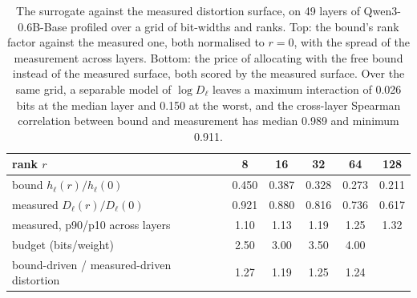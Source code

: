 \begin{table}[H]
\centering
\small
\setlength{\tabcolsep}{3pt}
\caption{The surrogate against the measured distortion surface, on 49 layers of Qwen3-0.6B-Base profiled over a grid of bit-widths and ranks. Top: the bound's rank factor against the measured one, both normalised to $r=0$, with the spread of the measurement across layers. Bottom: the price of allocating with the free bound instead of the measured surface, both scored by the measured surface. Over the same grid, a separable model of $\log D_\ell$ leaves a maximum interaction of 0.026 bits at the median layer and 0.150 at the worst, and the cross-layer Spearman correlation between bound and measurement has median 0.989 and minimum 0.911.}
\label{tab:surrogate}
\begin{tabular}{lccccc}
\toprule
rank $r$ & 8 & 16 & 32 & 64 & 128 \\
\midrule
bound $h_\ell(r)/h_\ell(0)$ & 0.450 & 0.387 & 0.328 & 0.273 & 0.211 \\
measured $D_\ell(r)/D_\ell(0)$ & 0.921 & 0.880 & 0.816 & 0.736 & 0.617 \\
measured, p90/p10 across layers & 1.10 & 1.13 & 1.19 & 1.25 & 1.32 \\
\midrule
budget (bits/weight) & 2.50 & 3.00 & 3.50 & 4.00 & \\
bound-driven / measured-driven distortion & 1.27 & 1.19 & 1.25 & 1.24 & \\
\bottomrule
\end{tabular}
\end{table}
